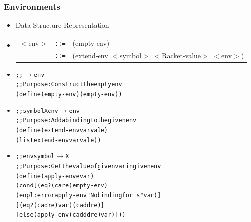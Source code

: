 \documentclass{beamer}
\newcommand{\arrow}{\(\rightarrow\)}
\newcommand{\quot}{\texttt{\textquotesingle{}}}
\newcommand{\is}{\texttt{::=}}
\begin{document}
\begin{frame}[fragile]
\frametitle{Environments}
\begin{scriptsize}
\begin{itemize}
\item<1-> Data Structure Representation

\item<1->
\begin{tabular}{lll}
   $<$env$>$ & \is{} & (empty-env) \\
         & \is{} & (extend-env $<$symbol$>$ $<$Racket-value$>$ $<$env$>$) \\
\end{tabular}

\item<2->
\begin{alltt}
;;  \arrow{} env
;; Purpose: Construct the empty env
(define (empty-env) \quot{}(empty-env))
\end{alltt}

\item<3->
\begin{alltt}

;; symbol X env \arrow{} env
;; Purpose: Add a binding to the given env
(define (extend-env var val e)
  (list \quot{}extend-env var val e))
\end{alltt}

\item<4->
\begin{alltt}
;; env symbol \arrow{} X
;; Purpose: Get the value of given var in given env
(define (apply-env e var)
  (cond [(eq? (car e) \quot{}empty-env)
         (eopl:error \quot{}apply-env "No binding for ~s" var)]
        [(eq? (cadr e) var) (caddr e)]
        [else (apply-env (cadddr e) var)]))
\end{alltt}

\end{itemize}
\end{scriptsize}
\end{frame}
\end{document}
